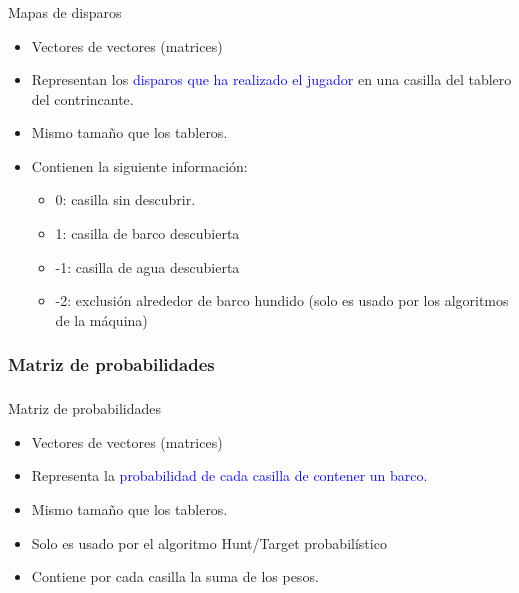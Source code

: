  \begin{frame}
     \frametitle{\insertsection}
     \framesubtitle{\hskip30pt \insertsubsection}
     \begin{block}{Mapas de disparos}
        \begin{itemize}
             \item Vectores de vectores (matrices)
             \item Representan los \textcolor{blue}{disparos que ha realizado el jugador} en una casilla del tablero del contrincante.
             \item Mismo tamaño que los tableros.
             \item Contienen la siguiente información:
             \begin{itemize}
                 \item 0: casilla sin descubrir.
                 \item 1: casilla de barco descubierta
                 \item -1: casilla de agua descubierta
                 \item -2: exclusión alrededor de barco hundido (solo es usado por los algoritmos de la máquina)
             \end{itemize}
        \end{itemize}
     \end{block}
 \end{frame}

 \subsubsection{Matriz de probabilidades}

 \begin{frame}
     \frametitle{\insertsection}
     \framesubtitle{\hskip30pt \insertsubsection}
     \begin{block}{Matriz de probabilidades}
         \begin{itemize}
             \item Vectores de vectores (matrices)
             \item Representa la \textcolor{blue}{probabilidad de cada casilla de contener un barco.}
             \item Mismo tamaño que los tableros.
             \item Solo es usado por el algoritmo Hunt/Target probabilístico
             \item Contiene por cada casilla la suma de los pesos.
         \end{itemize}
     \end{block}
 \end{frame}



